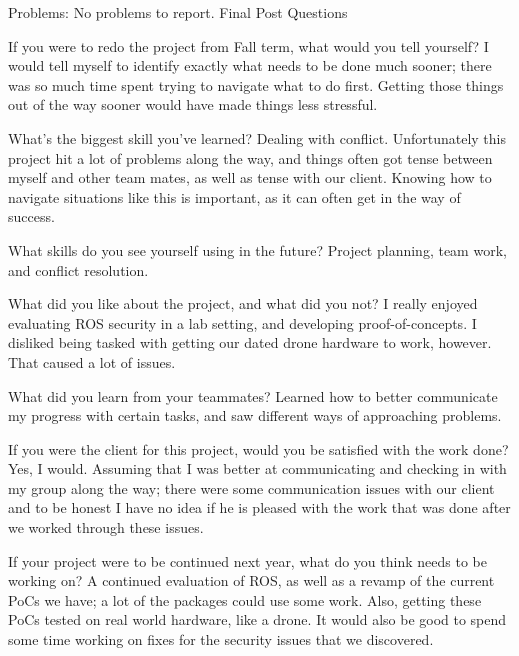 Problems: No problems to report.
Final Post Questions

    If you were to redo the project from Fall term, what would you tell yourself? I would tell myself to identify exactly what needs to be done much sooner; there was so much time spent trying to navigate what to do first. Getting those things out of the way sooner would have made things less stressful.

    What's the biggest skill you've learned? Dealing with conflict. Unfortunately this project hit a lot of problems along the way, and things often got tense between myself and other team mates, as well as tense with our client. Knowing how to navigate situations like this is important, as it can often get in the way of success.

    What skills do you see yourself using in the future? Project planning, team work, and conflict resolution.

    What did you like about the project, and what did you not? I really enjoyed evaluating ROS security in a lab setting, and developing proof-of-concepts. I disliked being tasked with getting our dated drone hardware to work, however. That caused a lot of issues.

    What did you learn from your teammates? Learned how to better communicate my progress with certain tasks, and saw different ways of approaching problems.

    If you were the client for this project, would you be satisfied with the work done? Yes, I would. Assuming that I was better at communicating and checking in with my group along the way; there were some communication issues with our client and to be honest I have no idea if he is pleased with the work that was done after we worked through these issues.

    If your project were to be continued next year, what do you think needs to be working on? A continued evaluation of ROS, as well as a revamp of the current PoCs we have; a lot of the packages could use some work. Also, getting these PoCs tested on real world hardware, like a drone. It would also be good to spend some time working on fixes for the security issues that we discovered.

